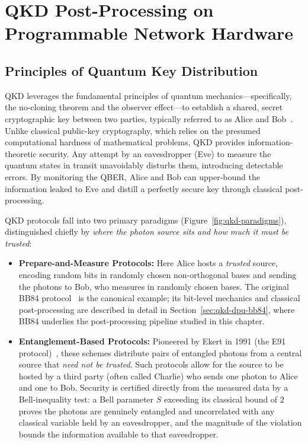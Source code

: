 \chapter{QKD Post-Processing on Programmable Network Hardware}
\label{ch:qkd-dpu}

\section{Principles of Quantum Key Distribution}
\label{sec:qkd-dpu-principles}

QKD leverages the fundamental principles of quantum mechanics---specifically, the no-cloning theorem and the observer effect---to establish a shared, secret cryptographic key between two parties, typically referred to as Alice and Bob~\cite{Xu2020}. Unlike classical public-key cryptography, which relies on the presumed computational hardness of mathematical problems, QKD provides information-theoretic security. Any attempt by an eavesdropper (Eve) to measure the quantum states in transit unavoidably disturbs them, introducing detectable errors. By monitoring the QBER, Alice and Bob can upper-bound the information leaked to Eve and distill a perfectly secure key through classical post-processing.

QKD protocols fall into two primary paradigms (Figure~\ref{fig:qkd-paradigms}), distinguished chiefly by \emph{where the photon source sits and how much it must be trusted}:
\begin{itemize}
    \item \textbf{Prepare-and-Measure Protocols:} Here Alice hosts a \emph{trusted} source, encoding random bits in randomly chosen non-orthogonal bases and sending the photons to Bob, who measures in randomly chosen bases. The original BB84 protocol~\cite{bennett1984quantum} is the canonical example; its bit-level mechanics and classical post-processing are described in detail in Section~\ref{sec:qkd-dpu-bb84}, where BB84 underlies the post-processing pipeline studied in this chapter.
    \item \textbf{Entanglement-Based Protocols:} Pioneered by Ekert in 1991 (the E91 protocol)~\cite{ekert1991quantum}, these schemes distribute pairs of entangled photons from a central source that \emph{need not be trusted}. Such protocols allow for the source to be hosted by a third party (often called Charlie) who sends one photon to Alice and one to Bob. Security is certified directly from the measured data by a Bell-inequality test: a Bell parameter $S$ exceeding its classical bound of $2$ proves the photons are genuinely entangled and uncorrelated with any classical variable held by an eavesdropper, and the magnitude of the violation bounds the information available to that eavesdropper.
\end{itemize}

